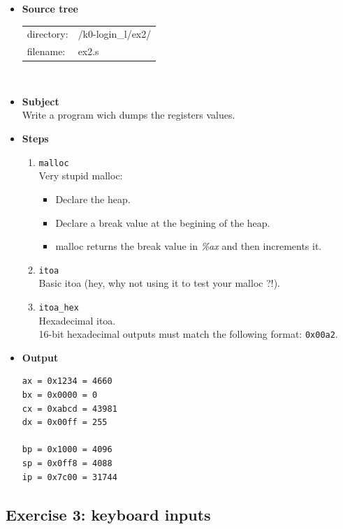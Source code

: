 \begin{itemize}
\item {\bf Source tree}\\
\begin{tabular}{p{4cm}l}
directory: & /k0-login\_l/ex2/\\
filename: & ex2.s
\end{tabular}
\\
\item {\bf Subject}\\
Write a program wich dumps the registers values.\\
\item {\bf Steps}
  \begin{enumerate}
  \item {\tt malloc}\\
  Very stupid malloc:
  \begin{itemize}
  \item Declare the heap.
  \item Declare a break value at the begining of the heap.
  \item malloc returns the break value in {\em \%ax} and then increments it.
  \end{itemize}
  \item {\tt itoa}\\
  Basic itoa (hey, why not using it to test your malloc ?!).
  \item {\tt itoa\_hex}\\
  Hexadecimal itoa.\\
  16-bit hexadecimal outputs must match the following format: {\tt 0x00a2}.
\\
  \end{enumerate}
\item {\bf Output}
\begin{verbatim}
ax = 0x1234 = 4660
bx = 0x0000 = 0
cx = 0xabcd = 43981
dx = 0x00ff = 255

bp = 0x1000 = 4096
sp = 0x0ff8 = 4088
ip = 0x7c00 = 31744
\end{verbatim}

\end{itemize}

\newpage

\subsection*{Exercise 3: keyboard inputs}

